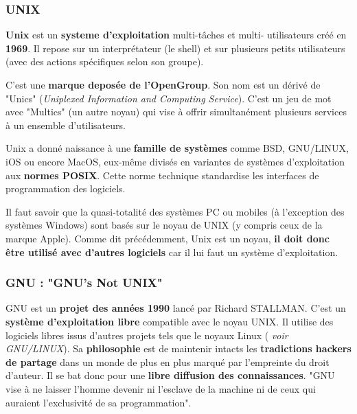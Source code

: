 \subsubsection{UNIX}

\textbf{Unix} est un \textbf{systeme d'exploitation} multi-tâches et multi-
utilisateurs créé en \textbf{1969}.
Il repose sur un interprétateur (le shell) et sur plusieurs petits utilisateurs
(avec des actions spécifiques selon son groupe).

C'est une \textbf{marque deposée de l'OpenGroup}.
Son nom est un dérivé de "Unics" (\textit{Uniplexed Information and Computing
Service}). C'est un jeu de mot avec "Multics"
(un autre noyau) qui vise à offrir simultanément plusieurs services à un
ensemble d'utilisateurs.

Unix a donné naissance à une \textbf{famille de systèmes} comme BSD, GNU/LINUX,
iOS ou encore MacOS, eux-même divisés en variantes de systèmes d'exploitation
aux \textbf{normes POSIX}. Cette norme technique standardise les interfaces de
programmation des logiciels.\newline

Il faut savoir que la quasi-totalité des systèmes PC ou mobiles (à l'exception
des systèmes Windows) sont basés sur le noyau de UNIX (y compris ceux de la
marque Apple).
Comme dit précédemment, Unix est un noyau, \textbf{il doit donc être utilisé
avec d'autres logiciels} car il lui faut un système d'exploitation.

\subsubsection{GNU : "GNU's Not UNIX"}

GNU est un \textbf{projet des années 1990} lancé par Richard STALLMAN. C'est un
\textbf{système d'exploitation libre} compatible avec le noyau UNIX. Il utilise
des logiciels libres issus d'autres projets tels que le noyaux Linux (\textit{
voir GNU/LINUX}).
Sa \textbf{philosophie} est de maintenir intacts les \textbf{tradictions hackers
de partage} dans un monde de plus en plus marqué par l'empreinte du droit
d'auteur. Il se bat donc pour une \textbf{libre diffusion des connaissances}.
"GNU vise à ne laisser l'homme devenir ni l'esclave de la machine ni de ceux qui auraient l'exclusivité de sa programmation".\newline

